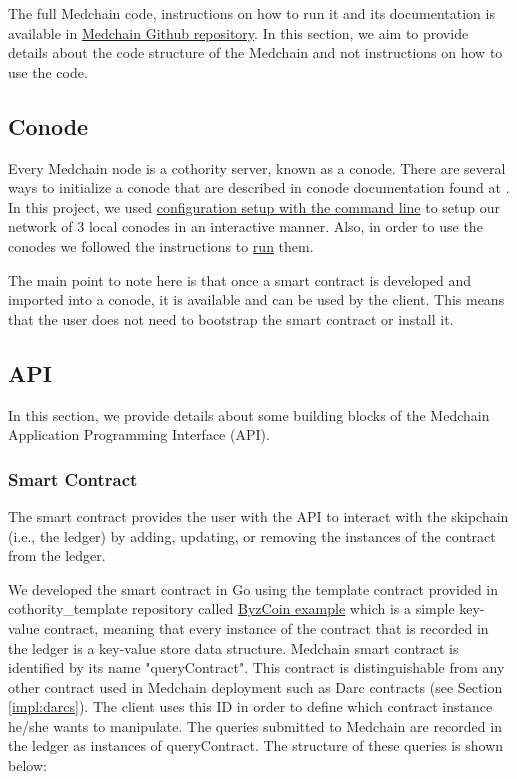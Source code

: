 The full Medchain code, instructions on how to run it and its documentation is available in \href{https://github.com/ldsec/medchain/tree/dev}{Medchain Github repository}. In this section, we aim to provide details about the code structure of the Medchain and not instructions on how to use the code.  

\subsection{Conode}
Every Medchain node is a cothority server, known as a conode. There are several ways to initialize a conode that are described in conode documentation found at \cite{conode:2019}. In this project, we used \href{https://github.com/dedis/cothority/blob/master/conode/README.md#option-1-computer-configuration-setup-with-the-command-line}{configuration setup with the command line} to setup our network of 3 local conodes in an interactive manner. Also, in order to use the conodes we followed the instructions to \href{https://github.com/dedis/cothority/blob/master/conode/README.md#option-1-computer-run-with-the-command-line}{run} them. 

The main point to note here is that once a smart contract is developed and imported into a conode, it is available and can be used by the client. This means that the user does not need to bootstrap the smart contract or install it.  

\subsection{API}
In this section, we provide details about some building blocks of the Medchain Application Programming Interface (API). 

\subsubsection{Smart Contract} \label{impl:smart_contract}
The smart contract provides the user with the API to interact with the skipchain (i.e., the ledger) by adding, updating, or removing the instances of the contract from the ledger. 

We developed the smart contract in Go using the template contract provided in cothority\_template repository called  \href{https://github.com/dedis/cothority_template/tree/master/byzcoin}{ByzCoin example} which is a simple key-value contract, meaning that every instance of the contract that is recorded in the ledger is a key-value store data structure. Medchain smart contract is identified by its name "queryContract". This contract is distinguishable from any other contract used in Medchain deployment such as Darc contracts (see Section \ref{impl:darcs}). The client uses this ID in order to define which contract instance he/she wants to manipulate. The queries submitted to Medchain are recorded in the ledger as instances of queryContract. The structure of these queries is shown below: 

